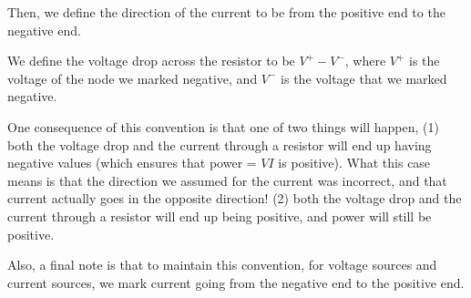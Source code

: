 \begin{enumerate}
{Then, we define the direction of the current to be from the positive end to the negative end. 

We define the voltage drop across the resistor to be $V^+ - V^-$, where $V^+$ is the voltage of the node we marked negative, and $V^-$ is the voltage that we marked negative. 

One consequence of this convention is that one of two things will happen, (1) both the voltage drop and the current through a resistor will end up having negative values (which ensures that power = $VI$ is positive). What this case means is that the direction we assumed for the current was incorrect, and that current actually goes in the opposite direction!
(2) both the voltage drop and the current through a resistor will end up being positive, and power will still be positive. 

Also, a final note is that to maintain this convention, for voltage sources and current sources, we mark current going from the negative end to the positive end. 



}





\end{enumerate}